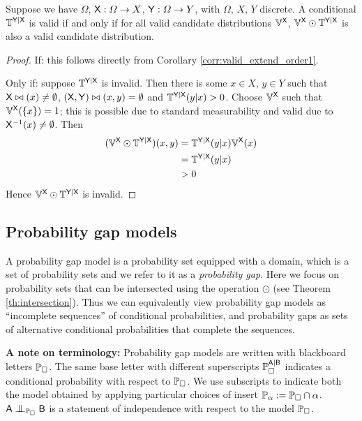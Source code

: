 \begin{theorem}\label{th:valid_conditional_probability}
Suppose we have $\Omega$, $\mathsf{X}:\Omega\to X$, $\mathsf{Y}:\Omega\to Y$, with $\Omega$, $X$, $Y$ discrete. A conditional $\mathbb{T}^{\mathsf{Y}|\mathsf{X}}$ is valid if and only if for all valid candidate distributions $\mathbb{V}^{\mathsf{X}}$, $\mathbb{V}^{\mathsf{X}}\odot \mathbb{T}^{\mathsf{Y}|\mathsf{X}}$ is also a valid candidate distribution.
\end{theorem}

\begin{proof}
If: this follows directly from Corollary \ref{corr:valid_extend_order1}.

Only if: suppose $\mathbb{T}^{\mathsf{Y}|\mathsf{X}}$ is invalid. Then there is some $x\in X$, $y\in Y$ such that $\mathsf{X}\bowtie(x)\neq \emptyset$, $(\mathsf{X},\mathsf{Y})\bowtie(x,y)=\emptyset$ and $\mathbb{T}^{\mathsf{Y}|\mathsf{X}}(y|x)>0$. Choose $\mathbb{V}^{\mathsf{X}}$ such that $\mathbb{V}^{\mathsf{X}}(\{x\})=1$; this is possible due to standard measurability and valid due to $\mathsf{X}^{-1}(x)\neq \emptyset$. Then
\begin{align}
	(\mathbb{V}^{\mathsf{X}}\odot \mathbb{T}^{\mathsf{Y}|\mathsf{X}})(x,y) &= \mathbb{T}^{\mathsf{Y}|\mathsf{X}}(y|x) \mathbb{V}^{\mathsf{X}}(x)\\
																	 &= \mathbb{T}^{\mathsf{Y}|\mathsf{X}}(y|x)\\
																	 &>0
\end{align}
Hence $\mathbb{V}^{\mathsf{X}}\odot \mathbb{T}^{\mathsf{Y}|\mathsf{X}}$ is invalid.
\end{proof}

\subsection{Probability gap models}


A probability gap model is a probability set equipped with a domain, which is a set of probability sets and we refer to it as a \emph{probability gap}. Here we focus on probability sets that can be intersected using the operation $\odot$ (see Theorem \ref{th:intersection}). Thus we can equivalently view probability gap models as ``incomplete sequences'' of conditional probabilities, and probability gaps as sets of alternative conditional probabilities that complete the sequences.

\textbf{A note on terminology:} Probability gap models are written with blackboard letters $\mathbb{P}_\square$. The same base letter with different superscripts $\mathbb{P}_\square^{\mathsf{A}|\mathsf{B}}$ indicates a conditional probability with respect to $\mathbb{P}_\square$. We use subscripts to indicate both the model obtained by applying particular choices of insert $\mathbb{P}_\alpha:=\mathbb{P}_\square \cap \alpha$. $\RV{A}\CI_{\prob{P}_\square} \RV{B}$ is a statement of independence with respect to the model $\mathbb{P}_\square$.

